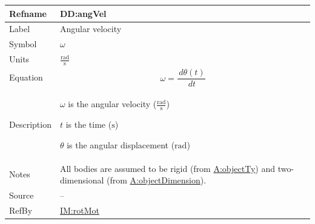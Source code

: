\documentclass[12pt]{article}
\begin{document}
\medskip
\noindent
\begin{minipage}{\textwidth}
\begin{tabular}{>{\raggedright}p{}>{\raggedright\arraybackslash}p{}}
\toprule \textbf{Refname} & \textbf{DD:angVel}
\label{DD:angVel}
\\ \midrule
Label & Angular velocity
        
\\ \midrule
Symbol & $ω$
         
\\ \midrule
Units & $\frac{\text{rad}}{\text{s}}$
        
\\ \midrule
Equation & \begin{displaymath}
           ω=\frac{\,dθ\left(t\right)}{\,dt}
           \end{displaymath}
\\ \midrule
Description & \begin{symbDescription}
              \item{$ω$ is the angular velocity ($\frac{\text{rad}}{\text{s}}$)}
              \item{$t$ is the time (${\text{s}}$)}
              \item{$θ$ is the angular displacement (${\text{rad}}$)}
              \end{symbDescription}
\\ \midrule
Notes & All bodies are assumed to be rigid (from \hyperref[assumpOT]{A:objectTy}) and two-dimensional (from \hyperref[assumpOD]{A:objectDimension}).
        
\\ \midrule
Source & --
         
\\ \midrule
RefBy & \hyperref[IM:rotMot]{IM:rotMot}
        
\\ \bottomrule
\end{tabular}
\end{minipage}
\end{document}
